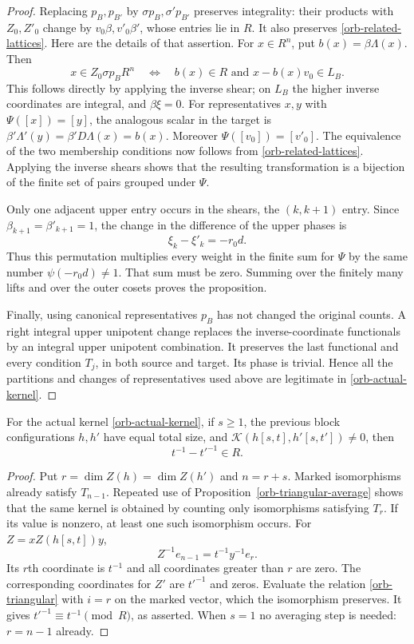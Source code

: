 \begin{proof}
Replacing $p_B,p_{B'}$ by $\sigma p_B,\sigma'p_{B'}$
preserves integrality: their products with $Z_0,Z'_0$ change
by $v_0\beta,v'_0\beta'$, whose entries lie in $R$.
It also preserves \eqref{orb-related-lattices}.
Here are the details of that assertion.  For $x\in R^n$,
put $b(x)=\beta\Lambda(x)$.  Then
\[
 x\in Z_0\sigma p_BR^n
 \quad\Longleftrightarrow\quad
 b(x)\in R\text{ and }x-b(x)v_0\in L_B.
\]
This follows directly by applying the inverse shear; on
$L_B$ the higher inverse coordinates are integral, and
$\beta\xi=0$.
For representatives $x,y$ with $\Psi([x])=[y]$, the analogous
scalar in the target is
$\beta'\Lambda'(y)=\beta'D\Lambda(x)=b(x)$.
Moreover $\Psi([v_0])=[v'_0]$.  The equivalence of the two
membership conditions now follows from
\eqref{orb-related-lattices}.  Applying the inverse shears
shows that the resulting transformation is a bijection of
the finite set of pairs grouped under $\Psi$.

Only one adjacent upper entry occurs in the shears, the
$(k,k+1)$ entry.  Since $\beta_{k+1}=\beta'_{k+1}=1$, the
change in the difference of the upper phases is
\[
 \xi_k-\xi'_k=-r_0d.
\]
Thus this permutation multiplies every weight in the finite
sum for $\Psi$ by the same number $\psi(-r_0d)\ne1$.
That sum must be zero.  Summing over the finitely many lifts
and over the outer cosets proves the proposition.

Finally, using canonical representatives $p_B$ has not
changed the original counts.  A right integral upper
unipotent change replaces the inverse-coordinate functionals
by an integral upper unipotent combination.  It preserves
the last functional and every condition $T_j$, in both
source and target.  Its phase is trivial.  Hence all the
partitions and changes of representatives used above are
legitimate in \eqref{orb-actual-kernel}.
\end{proof}

\begin{corollary}\label{orb-support-proved}
For the actual kernel \eqref{orb-actual-kernel}, if $s\ge1$,
the previous block configurations $h,h'$ have equal total
size, and
$\mathcal K(h[s,t],h'[s,t'])\ne0$, then
\[
 t^{-1}-t'^{-1}\in R.
\]
\end{corollary}

\begin{proof}
Put $r=\dim Z(h)=\dim Z(h')$ and $n=r+s$.
Marked isomorphisms already satisfy $T_{n-1}$.
Repeated use of Proposition~\ref{orb-triangular-average}
shows that the same kernel is obtained by counting only
isomorphisms satisfying $T_r$.
If its value is nonzero, at least one such isomorphism occurs.
For $Z=xZ(h[s,t])y$,
\[
 Z^{-1}e_{n-1}=t^{-1}y^{-1}e_r.
\]
Its $r$th coordinate is $t^{-1}$ and all coordinates greater
than $r$ are zero.  The corresponding coordinates for $Z'$
are $t'^{-1}$ and zeros.  Evaluate the relation
\eqref{orb-triangular} with $i=r$ on the marked vector,
which the isomorphism preserves.  It gives
$t'^{-1}\equiv t^{-1}\pmod R$, as asserted.
When $s=1$ no averaging step is needed: $r=n-1$ already.
\end{proof}

